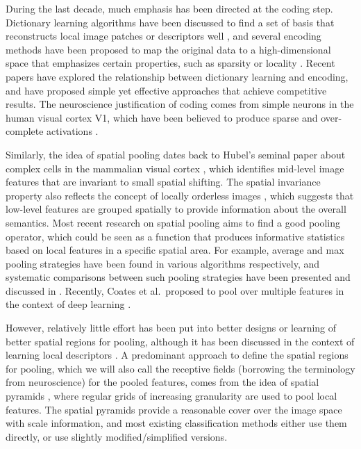 During the last decade, much emphasis has been directed at the coding step. Dictionary learning algorithms have been discussed to find a set of basis that reconstructs local image patches or descriptors well \cite{mairal2010online,coates2011icml}, and several encoding methods have been proposed to map the original data to a high-dimensional space that emphasizes certain properties, such as sparsity \cite{Olshausen:1997uh,Yang:2009vb,yang2010efficient} or locality \cite{wang2010locality}. Recent papers \cite{coates2010aistats, Rigamonti:2011uc, coates2011icml} have explored the relationship between dictionary learning and encoding, and have proposed simple yet effective approaches that achieve competitive results. The neuroscience justification of coding comes from simple neurons in the human visual cortex V1, which have been believed to produce sparse and over-complete activations \cite{Olshausen:1997uh}.

Similarly, the idea of spatial pooling dates back to Hubel's seminal paper about complex cells in the mammalian visual cortex \cite{Hubel:1962vm}, which identifies mid-level image features that are invariant to small spatial shifting. The spatial invariance property also reflects the concept of locally orderless images \cite{Koenderink:1999bh}, which suggests that low-level features are grouped spatially to provide information about the overall semantics. Most recent research on spatial pooling aims to find a good pooling operator, which could be seen as a function that produces informative statistics based on local features in a specific spatial area. For example, average and max pooling strategies have been found in various algorithms respectively, and systematic comparisons between such pooling strategies have been presented and discussed in \cite{Boureau:uq,Boureau:2010wz}. Recently, Coates et al.\ proposed to pool over multiple features in the context of deep learning \cite{coates2011selecting}.

However, relatively little effort has been put into better designs or learning of better spatial regions for pooling, although it has been discussed in the context of learning local descriptors \cite{winder2007learning}. A predominant approach to define the spatial regions for pooling, which we will also call the receptive fields (borrowing the terminology from neuroscience) for the pooled features, comes from the idea of spatial pyramids \cite{lazebnik2006beyond, Yang:2009vb}, where regular grids of increasing granularity are used to pool local features. The spatial pyramids provide a reasonable cover over the image space with scale information, and most existing classification methods either use them directly, or use slightly modified/simplified versions.

